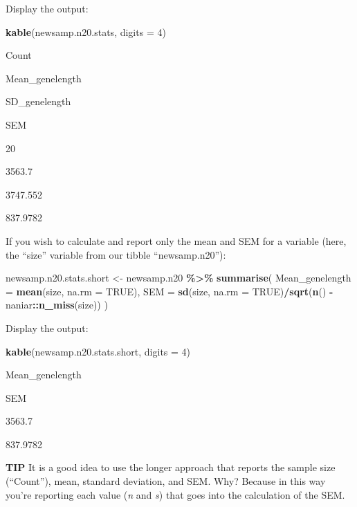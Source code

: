 \documentclass[
]{book}
\newenvironment{Shaded}{\begin{snugshade}}{\end{snugshade}}
\newcommand{\AttributeTok}[1]{\textcolor[rgb]{0.13,0.29,0.53}{#1}}
\newcommand{\ConstantTok}[1]{\textcolor[rgb]{0.56,0.35,0.01}{#1}}
\newcommand{\DecValTok}[1]{\textcolor[rgb]{0.00,0.00,0.81}{#1}}
\newcommand{\FunctionTok}[1]{\textcolor[rgb]{0.13,0.29,0.53}{\textbf{#1}}}
\newcommand{\NormalTok}[1]{#1}
\newcommand{\OtherTok}[1]{\textcolor[rgb]{0.56,0.35,0.01}{#1}}
\newcommand{\SpecialCharTok}[1]{\textcolor[rgb]{0.81,0.36,0.00}{\textbf{#1}}}
\begin{document}
Display the output:

\begin{Shaded}
\begin{Highlighting}[]
\FunctionTok{kable}\NormalTok{(newsamp.n20.stats, }\AttributeTok{digits =} \DecValTok{4}\NormalTok{)}
\end{Highlighting}
\end{Shaded}

Count

Mean\_genelength

SD\_genelength

SEM

20

3563.7

3747.552

837.9782

If you wish to calculate and report only the mean and SEM for a variable (here, the ``size'' variable from our tibble ``newsamp.n20''):

\begin{Shaded}
\begin{Highlighting}[]
\NormalTok{newsamp.n20.stats.short }\OtherTok{\textless{}{-}}\NormalTok{ newsamp.n20 }\SpecialCharTok{\%\textgreater{}\%}
  \FunctionTok{summarise}\NormalTok{(}
    \AttributeTok{Mean\_genelength =} \FunctionTok{mean}\NormalTok{(size, }\AttributeTok{na.rm =} \ConstantTok{TRUE}\NormalTok{),}
    \AttributeTok{SEM =} \FunctionTok{sd}\NormalTok{(size, }\AttributeTok{na.rm =} \ConstantTok{TRUE}\NormalTok{)}\SpecialCharTok{/}\FunctionTok{sqrt}\NormalTok{(}\FunctionTok{n}\NormalTok{() }\SpecialCharTok{{-}}\NormalTok{ naniar}\SpecialCharTok{::}\FunctionTok{n\_miss}\NormalTok{(size))}
\NormalTok{  )}
\end{Highlighting}
\end{Shaded}

Display the output:

\begin{Shaded}
\begin{Highlighting}[]
\FunctionTok{kable}\NormalTok{(newsamp.n20.stats.short, }\AttributeTok{digits =} \DecValTok{4}\NormalTok{)}
\end{Highlighting}
\end{Shaded}

Mean\_genelength

SEM

3563.7

837.9782

\textbf{TIP}
It is a good idea to use the longer approach that reports the sample size (``Count''), mean, standard deviation, and SEM. Why? Because in this way you're reporting each value (\emph{n} and \emph{s}) that goes into the calculation of the SEM.
\end{document}
